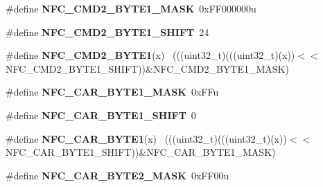 \begin{DoxyCompactItemize}
\item 
\hypertarget{group___n_f_c___register___masks_ga3a51c47c33164bf4e367f93db2436c20}{}\#define {\bfseries N\+F\+C\+\_\+\+C\+M\+D2\+\_\+\+B\+Y\+T\+E1\+\_\+\+M\+A\+S\+K}~0x\+F\+F000000u\label{group___n_f_c___register___masks_ga3a51c47c33164bf4e367f93db2436c20}

\item 
\hypertarget{group___n_f_c___register___masks_gae7a66e4a1e06183409e718f070599edc}{}\#define {\bfseries N\+F\+C\+\_\+\+C\+M\+D2\+\_\+\+B\+Y\+T\+E1\+\_\+\+S\+H\+I\+F\+T}~24\label{group___n_f_c___register___masks_gae7a66e4a1e06183409e718f070599edc}

\item 
\hypertarget{group___n_f_c___register___masks_ga496b28189e04cf9a8e0b8637234296e6}{}\#define {\bfseries N\+F\+C\+\_\+\+C\+M\+D2\+\_\+\+B\+Y\+T\+E1}(x)                                            ~(((uint32\+\_\+t)(((uint32\+\_\+t)(x))$<$$<$N\+F\+C\+\_\+\+C\+M\+D2\+\_\+\+B\+Y\+T\+E1\+\_\+\+S\+H\+I\+F\+T))\&N\+F\+C\+\_\+\+C\+M\+D2\+\_\+\+B\+Y\+T\+E1\+\_\+\+M\+A\+S\+K)\label{group___n_f_c___register___masks_ga496b28189e04cf9a8e0b8637234296e6}

\item 
\hypertarget{group___n_f_c___register___masks_gad58ff9d2dbcca29c4c85d786d02742c9}{}\#define {\bfseries N\+F\+C\+\_\+\+C\+A\+R\+\_\+\+B\+Y\+T\+E1\+\_\+\+M\+A\+S\+K}~0x\+F\+Fu\label{group___n_f_c___register___masks_gad58ff9d2dbcca29c4c85d786d02742c9}

\item 
\hypertarget{group___n_f_c___register___masks_gac7e9f2eb58bbd546c032d4e42419ae1f}{}\#define {\bfseries N\+F\+C\+\_\+\+C\+A\+R\+\_\+\+B\+Y\+T\+E1\+\_\+\+S\+H\+I\+F\+T}~0\label{group___n_f_c___register___masks_gac7e9f2eb58bbd546c032d4e42419ae1f}

\item 
\hypertarget{group___n_f_c___register___masks_ga048c547da098fef8afed59bc82c6b7c9}{}\#define {\bfseries N\+F\+C\+\_\+\+C\+A\+R\+\_\+\+B\+Y\+T\+E1}(x)                                              ~(((uint32\+\_\+t)(((uint32\+\_\+t)(x))$<$$<$N\+F\+C\+\_\+\+C\+A\+R\+\_\+\+B\+Y\+T\+E1\+\_\+\+S\+H\+I\+F\+T))\&N\+F\+C\+\_\+\+C\+A\+R\+\_\+\+B\+Y\+T\+E1\+\_\+\+M\+A\+S\+K)\label{group___n_f_c___register___masks_ga048c547da098fef8afed59bc82c6b7c9}

\item 
\hypertarget{group___n_f_c___register___masks_ga2874ad7e57d9e587bc3030dc64404d6b}{}\#define {\bfseries N\+F\+C\+\_\+\+C\+A\+R\+\_\+\+B\+Y\+T\+E2\+\_\+\+M\+A\+S\+K}~0x\+F\+F00u\label{group___n_f_c___register___masks_ga2874ad7e57d9e587bc3030dc64404d6b}


\end{DoxyCompactItemize}
